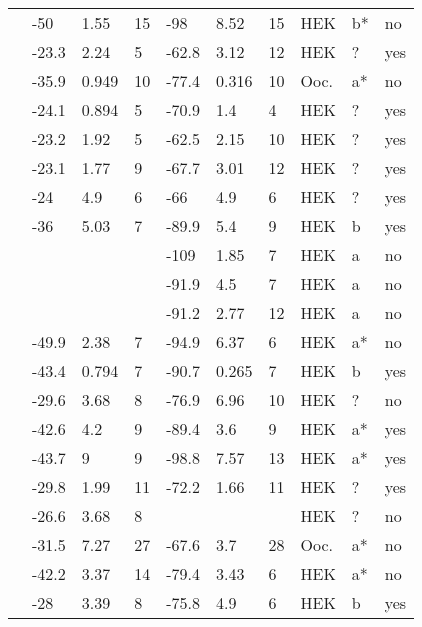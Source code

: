 \begin{longtable}{p{5cm}|lll|lll|lll}
\citet{Pfahnl2007MutationDB} & -50 & 1.55 & 15 & -98 & 8.52 & 15 & HEK & b* & no \\
\citet{Rivolta2001MutationDB} & -23.3 & 2.24 & 5 & -62.8 & 3.12 & 12 & HEK & ? & yes \\
\citet{Rook1999MutationDB} & -35.9 & 0.949 & 10 & -77.4 & 0.316 & 10 & Ooc. & a* & no \\
\citet{Rossenbacker2004MutationDB} & -24.1 & 0.894 & 5 & -70.9 & 1.4 & 4 & HEK & ? & yes \\
\citet{Ruan2007MutationDB} & -23.2 & 1.92 & 5 & -62.5 & 2.15 & 10 & HEK & ? & yes \\
\citet{Ruan2010MutationDB} & -23.1 & 1.77 & 9 & -67.7 & 3.01 & 12 & HEK & ? & yes \\
\citet{Saber2015MutationDB} & -24 & 4.9 & 6 & -66 & 4.9 & 6 & HEK & ? & yes \\
\citet{Samani2009MutationDB} & -36 & 5.03 & 7 & -89.9 & 5.4 & 9 & HEK & b & yes \\
\citet{Sarhan2009MutationDB} & && & -109 & 1.85 & 7 & HEK & a & no \\
\citet{Shinlapawittayatorn2011aMutationDB} & && & -91.9 & 4.5 & 7 & HEK & a & no \\
\citet{Shinlapawittayatorn2011bMutationDB} & && & -91.2 & 2.77 & 12 & HEK & a & no \\
\citet{Shirai2002MutationDB} & -49.9 & 2.38 & 7 & -94.9 & 6.37 & 6 & HEK & a* & no \\
\citet{Shuraih2007MutationDB} & -43.4 & 0.794 & 7 & -90.7 & 0.265 & 7 & HEK & b & yes \\
\citet{Shy2014MutationDB} & -29.6 & 3.68 & 8 & -76.9 & 6.96 & 10 & HEK & ? & no \\
\citet{Smits2005aMutationDB} & -42.6 & 4.2 & 9 & -89.4 & 3.6 & 9 & HEK & a* & yes \\
\citet{Smits2005bMutationDB} & -43.7 & 9 & 9 & -98.8 & 7.57 & 13 & HEK & a* & yes \\
\citet{Sottas2013MutationDB} & -29.8 & 1.99 & 11 & -72.2 & 1.66 & 11 & HEK & ? & yes \\
\citet{Splawski2002MutationDB} & -26.6 & 3.68 & 8 & && & HEK & ? & no \\
\citet{Surber2008MutationDB} & -31.5 & 7.27 & 27 & -67.6 & 3.7 & 28 & Ooc. & a* & no \\
\citet{Surber2008MutationDB} & -42.2 & 3.37 & 14 & -79.4 & 3.43 & 6 & HEK & a* & no \\
\citet{Swan2014MutationDB} & -28 & 3.39 & 8 & -75.8 & 4.9 & 6 & HEK & b & yes \\

\end{longtable}
